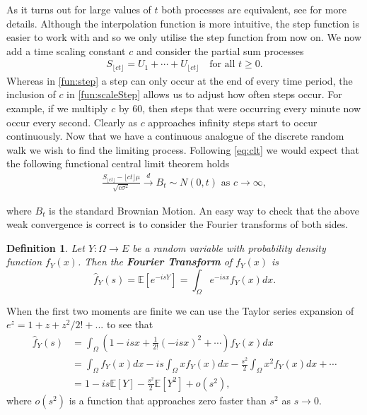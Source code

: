 \documentclass[honours,12pt]{UNSWthesis}
\newcommand{\E}{\mathbb{E}}
\newcommand{\1}{\mathbf 1}
\newtheorem{definition}[theorem]{Definition}
\numberwithin{equation}{section}
\theoremstyle{definition}
\theoremstyle{remark}
\begin{document}
\noindent As it turns out for large values of $t$ both processes are equivalent, see \cite{Whitt2010} for more details. Although the interpolation function is more intuitive, the step function is easier to work with and so we only utilise the step function from now on. We now add a time scaling constant $c$ and consider the partial sum processes
\begin{align}\label{fun:scaleStep}
	S_{\lfloor ct \rfloor}=U_1+\cdots+U_{\lfloor ct \rfloor}  \quad\textrm{for all } t\geq0.
\end{align}
Whereas in \ref{fun:step} a step can only occur at the end of every time period, the inclusion of $c$ in \ref{fun:scaleStep} allows us to adjust how often steps occur. For example, if we multiply $c$ by 60, then steps that were occurring every minute now occur every second. Clearly as $c$ approaches infinity steps start to occur continuously. Now that we have a continuous analogue of the discrete random walk we wish to find the limiting process. Following \ref{eq:clt} we would expect that the following functional central limit theorem holds
\begin{align}\label{eq:BMconv}
	\frac{S_{\lfloor ct\rfloor}-\lfloor ct \rfloor \mu}{\sqrt{c\sigma^2}}\overset{d}{\longrightarrow}B_t\sim N(0,t)\textrm{ as $c\to\infty$},
\end{align}

\noindent where $B_t$ is the standard Brownian Motion. An easy way to check that the above weak convergence is correct is to consider the Fourier transforms of both sides.\\
\begin{definition}
	Let $Y:\Omega\to E$ be a random variable with probability density function $f_Y(x)$. Then the \textbf{Fourier Transform}  of $f_Y(x)$ is
	\[
		\hat{f}_Y(s)=\E[e^{-isY}]=\int_\Omega e^{-isx} f_Y(x)dx.
	\]
\end{definition}

\noindent When the first two moments are finite we can use the Taylor series expansion of $e^z=1+z+z^2/2!+...$ to see that
\begin{align}
	\hat{f}_Y(s)&=\int_\Omega\left(1-isx+\frac{1}{2!}(-isx)^2+\cdots \right)f_Y(x)dx\\
	&=\int_\Omega f_Y(x)dx - is \int_\Omega x f_Y(x)dx - \frac{s^2}{2}\int_\Omega x^2 f_Y(x)dx +\cdots\\
	&=1-is\E[Y]-\frac{s^2}{2}\E[Y^2] +o(s^2),
\end{align}
\noindent where $o(s^2)$ is a function that approaches zero faster than $s^2$ as $s\to0.$ 
\end{document}
